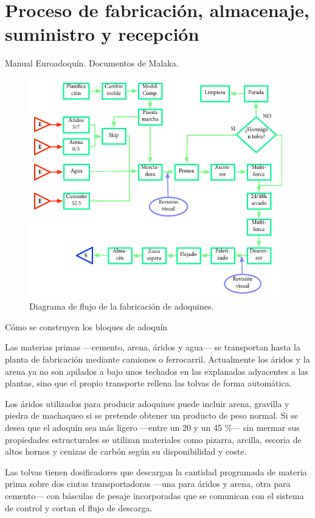 \chapter{Proceso de fabricación, almacenaje, suministro y recepción}
Manual Euroadoquín. Documentos de Malaka.

\begin{figure}[!htb]
\centering
\includegraphics[width=15cm]{diagrama.png}
\caption{Diagrama de flujo de la fabricación de adoquines.}
\label{fig:diagrama_de_flujo}
\end{figure}

Cómo se construyen los bloques de adoquín

Las materias primas —cemento, arena, áridos y agua— se transportan hasta la planta de fabricación mediante camiones o ferrocarril. Actualmente los áridos y la arena ya no son apilados a bajo unos techados en las explanadas adyacentes a las plantas, sino que el propio transporte rellena las tolvas de forma automática.

Los áridos utilizados para producir adoquines puede incluir arena, gravilla y piedra de machaqueo si se pretende obtener un producto de peso normal. Si se desea que el adoquín sea más ligero —entre un 20 y un 45 \%— sin mermar sus propiedades estructurales se utilizan materiales como pizarra, arcilla, escoria de altos hornos y cenizas de carbón según su disponibilidad y coste.

Las tolvas tienen dosificadores que descargan la cantidad programada de materia prima sobre dos cintas transportadoras —una para áridos y arena, otra para cemento— con básculas de pesaje incorporadas que se comunican con el sistema de control y cortan el flujo de descarga.

